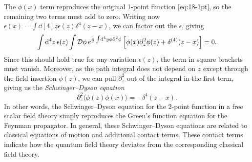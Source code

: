 The $\phi(x)$ term reproduces the original 1-point function \eqref{eq:18-1pt}, so the remaining two terms must add to zero.
Writing now $\epsilon(x) = \int	\dd[4]{z} \epsilon(z) \delta^{4} (z - x)$, we can factor out the $\epsilon$, giving 
\begin{equation}
  \label{eq:18-3}
  \int \dd[4]{z} \epsilon(z) \int \mathop{\mathcal{D} \phi} e^{\frac{1}{2} \int \dd[4]{y} \phi \partial^2 \phi} \left[ \phi(x) \partial^2_z \phi(z) + \delta^{(4)}(z - x) \right] = 0.
\end{equation}
Since this should hold true for any variation $\epsilon(z)$, the term in square brackets must vanish.
Moreover, as the path integral does not depend on $z$ except through the field insertion $\phi(z)$, we can pull $\partial^2_z$ out of the integral in the first term, giving us the \emph{Schwinger--Dyson equation}
\begin{equation}
  \partial_z^2 \langle \phi(z) \phi(x) \rangle = -\delta^{4} (z - x).
\end{equation}
In other words, the Schwinger--Dyson equation for the 2-point function in a free scalar field theory simply reproduces the Green's function equation for the Feynman propagator.
In general, these Schwinger--Dyson equations are related to classical equations of motion and additional contact terms.
These contact terms indicate how the quantum field theory deviates from the corresponding classical field theory.

